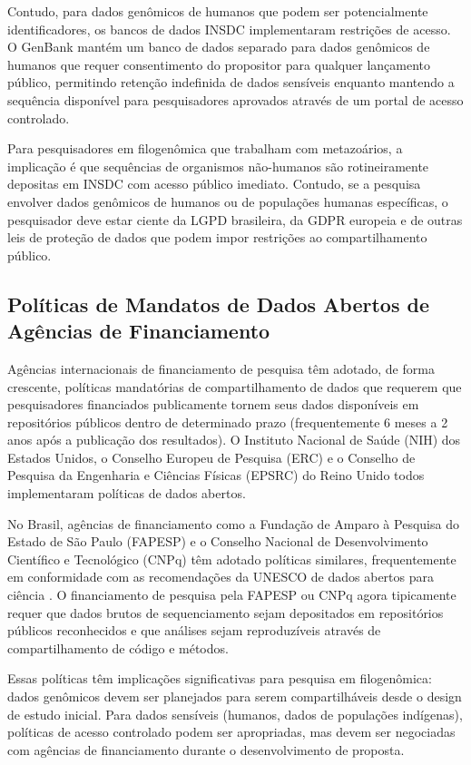 Contudo, para dados genômicos de humanos que podem ser potencialmente identificadores, os bancos de dados INSDC implementaram restrições de acesso. O GenBank mantém um banco de dados separado para dados genômicos de humanos que requer consentimento do propositor para qualquer lançamento público, permitindo retenção indefinida de dados sensíveis enquanto mantendo a sequência disponível para pesquisadores aprovados através de um portal de acesso controlado.

Para pesquisadores em filogenômica que trabalham com metazoários, a implicação é que sequências de organismos não-humanos são rotineiramente depositas em INSDC com acesso público imediato. Contudo, se a pesquisa envolver dados genômicos de humanos ou de populações humanas específicas, o pesquisador deve estar ciente da LGPD brasileira, da GDPR europeia e de outras leis de proteção de dados que podem impor restrições ao compartilhamento público.

\subsection{Políticas de Mandatos de Dados Abertos de Agências de Financiamento}

Agências internacionais de financiamento de pesquisa têm adotado, de forma crescente, políticas mandatórias de compartilhamento de dados que requerem que pesquisadores financiados publicamente tornem seus dados disponíveis em repositórios públicos dentro de determinado prazo (frequentemente 6 meses a 2 anos após a publicação dos resultados). O Instituto Nacional de Saúde (NIH) dos Estados Unidos, o Conselho Europeu de Pesquisa (ERC) e o Conselho de Pesquisa da Engenharia e Ciências Físicas (EPSRC) do Reino Unido todos implementaram políticas de dados abertos.

No Brasil, agências de financiamento como a Fundação de Amparo à Pesquisa do Estado de São Paulo (FAPESP) e o Conselho Nacional de Desenvolvimento Científico e Tecnológico (CNPq) têm adotado políticas similares, frequentemente em conformidade com as recomendações da UNESCO de dados abertos para ciência \parencite{unesco2021}. O financiamento de pesquisa pela FAPESP ou CNPq agora tipicamente requer que dados brutos de sequenciamento sejam depositados em repositórios públicos reconhecidos e que análises sejam reproduzíveis através de compartilhamento de código e métodos.

Essas políticas têm implicações significativas para pesquisa em filogenômica: dados genômicos devem ser planejados para serem compartilháveis desde o design de estudo inicial. Para dados sensíveis (humanos, dados de populações indígenas), políticas de acesso controlado podem ser apropriadas, mas devem ser negociadas com agências de financiamento durante o desenvolvimento de proposta.

